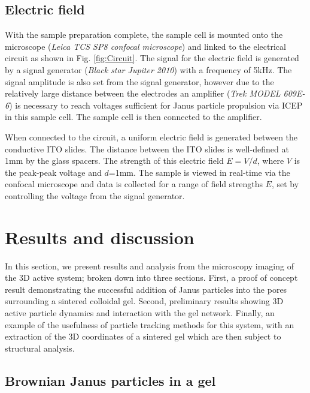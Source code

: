 \subsection{Electric field}
With the sample preparation complete, the sample cell is mounted onto the microscope (\textit{Leica TCS SP8 confocal microscope}) and linked to the electrical circuit as shown in Fig. \ref{fig:Circuit}. The signal for the electric field is generated by a signal generator (\textit{Black star Jupiter 2010}) with a frequency of 5kHz. The signal amplitude is also set from the signal generator, however due to the relatively large distance between the electrodes an amplifier (\textit{Trek MODEL 609E-6}) is necessary to  reach voltages sufficient for Janus particle propulsion via ICEP in this sample cell. The sample cell is then connected to the amplifier.

When connected to the circuit, a uniform electric field is generated between the conductive ITO slides. The distance between the ITO slides is well-defined at 1mm by the glass spacers. The strength of this electric field $E = V / d$, where $V$ is the peak-peak voltage and $d$=1mm. The sample is viewed in real-time via the confocal microscope and data is collected for a range of field strengths $E$, set by controlling the voltage from the signal generator.



\section{Results and discussion}
\label{section:expSystem:Results}
In this section, we present results and analysis from the microscopy imaging of the 3D active system; broken down into three sections. 
First, a proof of concept result demonstrating the successful addition of Janus particles into the pores surrounding a sintered colloidal gel. 
Second, preliminary results showing 3D active particle dynamics and interaction with the gel network. Finally, an example of the usefulness of particle tracking methods for this system, with an extraction of the 3D coordinates of a sintered gel which are then subject to structural analysis.


\subsection{Brownian Janus particles in a gel}

